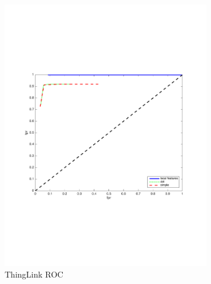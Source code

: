 \documentclass[english,12pt,a4paper,pdftex,elec,utf8, table]{aaltothesis}
\begin{document}
\begin{figure}[htb]
\begin{center}
\begin{subfigure}[b]{0.49\textwidth}
    \includegraphics[width=\textwidth]{figures/thinglink_NormalizehistogramROC.pdf}
    \caption{ThingLink ROC}
    \label{Normalizepr}
  \end{subfigure}
  \begin{subfigure}[b]{0.49\textwidth}

\end{subfigure}
\end{center}
\end{figure}
\end{document}
